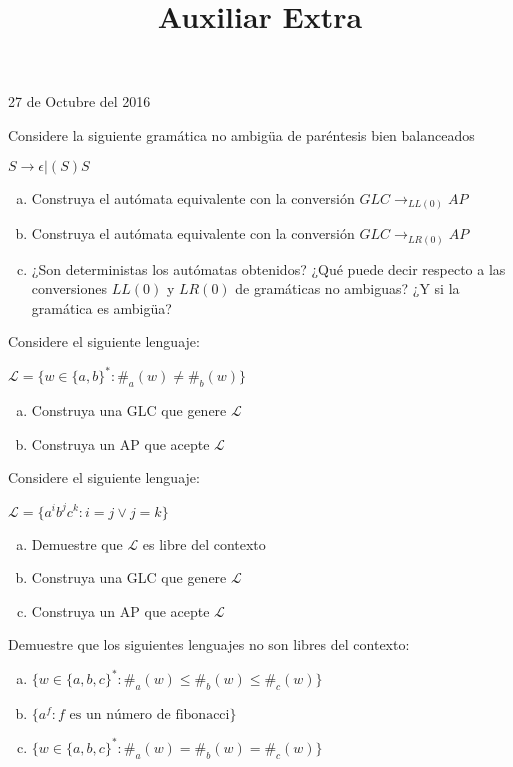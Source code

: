 \documentclass[dcc]{fcfmcourse}
\title{Auxiliar Extra}
\begin{document}
\maketitle
\begin{center}
27 de Octubre del 2016
\end{center}
\vspace{-1ex}
\begin{problems}
\problem Considere la siguiente gramática no ambigüa de paréntesis bien balanceados
\begin{center}
$S \rightarrow \epsilon | (S)S$
\end{center}
\begin{enumerate}[a)]
    \item Construya el autómata equivalente con la conversión $GLC \rightarrow_{LL(0)} AP$
    \item Construya el autómata equivalente con la conversión $GLC \rightarrow_{LR(0)} AP$
    \item ¿Son deterministas los autómatas obtenidos? ¿Qué puede decir respecto a las conversiones $LL(0)$ y $LR(0)$ de gramáticas no ambiguas? ¿Y si la gramática es ambigüa?
\end{enumerate}
\problem Considere el siguiente lenguaje:
\begin{center}
$\mathcal{L} = \{w \in \{a,b\}^* \colon \#_{a}(w) \not= \#_{b}(w)\}$
\end{center}
\begin{enumerate}[a)]
    \item Construya una GLC que genere $\mathcal{L}$
    \item Construya un AP que acepte $\mathcal{L}$
\end{enumerate}
\problem Considere el siguiente lenguaje:
\begin{center}
$\mathcal{L} = \{a^ib^jc^k \colon i=j\lor j=k\}$
\end{center}
\begin{enumerate}[a)]
    \item Demuestre que $\mathcal{L}$ es libre del contexto
    \item Construya una GLC que genere $\mathcal{L}$
    \item Construya un AP que acepte $\mathcal{L}$
\end{enumerate}
\problem Demuestre que los siguientes lenguajes no son libres del contexto:
\begin{enumerate}[a)]
    \item $\{w \in \{a,b,c\}^* \colon \#_{a}(w) \le \#_{b}(w) \le \#_{c}(w)\}$
    \item $\{a^{f} \colon f \text{ es un número de fibonacci}\}$
    \item $\{w \in \{a,b,c\}^* \colon \#_{a}(w) = \#_{b}(w) = \#_{c}(w)\}$
\end{enumerate}
\end{problems}
\end{document}
